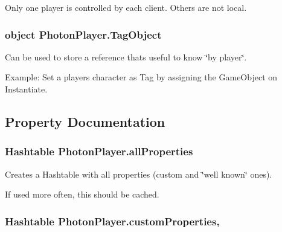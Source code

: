 Only one player is controlled by each client. Others are not local.

\subsubsection[{\texorpdfstring{Tag\+Object}{TagObject}}]{\setlength{\rightskip}{0pt plus 5cm}object Photon\+Player.\+Tag\+Object}\hypertarget{class_photon_player_aaf54b32878a605d3e4d47f16ad106aa3}{}\label{class_photon_player_aaf54b32878a605d3e4d47f16ad106aa3}


Can be used to store a reference that\textquotesingle{}s useful to know \char`\"{}by player\char`\"{}. 

Example\+: Set a player\textquotesingle{}s character as Tag by assigning the Game\+Object on Instantiate.

\subsection{Property Documentation}
\subsubsection[{\texorpdfstring{all\+Properties}{allProperties}}]{\setlength{\rightskip}{0pt plus 5cm}Hashtable Photon\+Player.\+all\+Properties\hspace{0.3cm}{\ttfamily [get]}}\hypertarget{class_photon_player_a82ba921802edc4960d075f1deacfb19d}{}\label{class_photon_player_a82ba921802edc4960d075f1deacfb19d}


Creates a Hashtable with all properties (custom and \char`\"{}well known\char`\"{} ones). 

If used more often, this should be cached.
\subsubsection[{\texorpdfstring{custom\+Properties}{customProperties}}]{\setlength{\rightskip}{0pt plus 5cm}Hashtable Photon\+Player.\+custom\+Properties\hspace{0.3cm}{\ttfamily [get]}, {\ttfamily [set]}}\hypertarget{class_photon_player_ab7e0bc6125b15524e74b5ac9d7c337d7}{}\label{class_photon_player_ab7e0bc6125b15524e74b5ac9d7c337d7}


